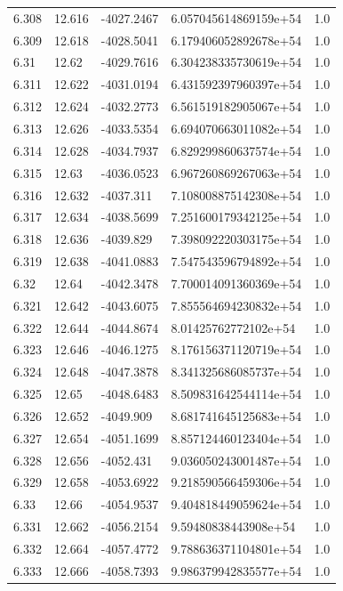\begin{tabular}{lllll}
6.308 & 12.616 & -4027.2467 & 6.057045614869159e+54 & 1.0 \\
6.309 & 12.618 & -4028.5041 & 6.179406052892678e+54 & 1.0 \\
6.31 & 12.62 & -4029.7616 & 6.304238335730619e+54 & 1.0 \\
6.311 & 12.622 & -4031.0194 & 6.431592397960397e+54 & 1.0 \\
6.312 & 12.624 & -4032.2773 & 6.561519182905067e+54 & 1.0 \\
6.313 & 12.626 & -4033.5354 & 6.694070663011082e+54 & 1.0 \\
6.314 & 12.628 & -4034.7937 & 6.829299860637574e+54 & 1.0 \\
6.315 & 12.63 & -4036.0523 & 6.967260869267063e+54 & 1.0 \\
6.316 & 12.632 & -4037.311 & 7.108008875142308e+54 & 1.0 \\
6.317 & 12.634 & -4038.5699 & 7.251600179342125e+54 & 1.0 \\
6.318 & 12.636 & -4039.829 & 7.398092220303175e+54 & 1.0 \\
6.319 & 12.638 & -4041.0883 & 7.547543596794892e+54 & 1.0 \\
6.32 & 12.64 & -4042.3478 & 7.700014091360369e+54 & 1.0 \\
6.321 & 12.642 & -4043.6075 & 7.855564694230832e+54 & 1.0 \\
6.322 & 12.644 & -4044.8674 & 8.01425762772102e+54 & 1.0 \\
6.323 & 12.646 & -4046.1275 & 8.176156371120719e+54 & 1.0 \\
6.324 & 12.648 & -4047.3878 & 8.341325686085737e+54 & 1.0 \\
6.325 & 12.65 & -4048.6483 & 8.509831642544114e+54 & 1.0 \\
6.326 & 12.652 & -4049.909 & 8.681741645125683e+54 & 1.0 \\
6.327 & 12.654 & -4051.1699 & 8.857124460123404e+54 & 1.0 \\
6.328 & 12.656 & -4052.431 & 9.036050243001487e+54 & 1.0 \\
6.329 & 12.658 & -4053.6922 & 9.218590566459306e+54 & 1.0 \\
6.33 & 12.66 & -4054.9537 & 9.404818449059624e+54 & 1.0 \\
6.331 & 12.662 & -4056.2154 & 9.59480838443908e+54 & 1.0 \\
6.332 & 12.664 & -4057.4772 & 9.788636371104801e+54 & 1.0 \\
6.333 & 12.666 & -4058.7393 & 9.986379942835577e+54 & 1.0 \\

\end{tabular}
